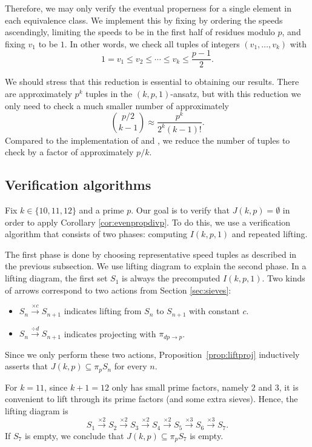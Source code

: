 \documentclass[11pt]{amsart}
\theoremstyle{definition}
\theoremstyle{remark}
\begin{document}
Therefore, we may only verify the eventual properness for a single element in each equivalence class. 
We implement this by fixing by ordering the speeds ascendingly,
limiting the speeds to be in the first half of residues modulo $p$, and fixing $v_1$ to be $1$.
In other words, we check all tuples of integers $(v_1,\ldots,v_k)$ with 
\[1=v_1\leq v_2\leq\cdots\leq v_k\leq\frac{p-1}{2}.\] 

We should stress that this reduction is essential to obtaining our results. 
There are approximately $p^k$ tuples in the $(k,p,1)$-ansatz,
but with this reduction we only need to check a much smaller number of approximately
\[\binom{p/2}{k-1}\approx\frac{p^k}{2^k(k-1)!}.\]
Compared to the implementation of \cite{Rosenfeld} and \cite{Trakulthongchai}, 
we reduce the number of tuples to check by a factor of approximately $p/k$. 

\subsection{Verification algorithms}
\label{subsec:algo}
Fix $k\in\{10,11,12\}$ and a prime $p$. Our goal is to verify that $J(k,p)=\emptyset$
in order to apply Corollary \ref{cor:evenpropdivp}. To do this, we use a verification algorithm that consists of two phases:
computing $I(k, p, 1)$ and repeated lifting.

The first phase is done by choosing representative speed tuples as described in the previous subsection. 
We use lifting diagram to explain the second phase. In a lifting diagram, the first set $S_1$ is always the precomputed $I(k,p,1)$. 
Two kinds of arrows correspond to two actions from Section \ref{sec:sieves}:
\begin{itemize}
    \item $S_n\xrightarrow{\times c}S_{n+1}$ indicates lifting from $S_n$ to $S_{n+1}$ with constant $c$.
    \item $S_n\xrightarrow{\div d}S_{n+1}$ indicates projecting with $\pi_{dp\rightarrow p}$.
\end{itemize}
Since we only perform these two actions, Proposition~\ref{prop:liftproj} inductively asserts that 
$J(k,p) \subseteq \pi_p S_n$ for every $n$. 

For $k=11$, since $k+1=12$ only has small prime factors, namely $2$ and $3$,
it is convenient to lift through its prime factors (and some extra sieves). Hence, the lifting diagram is
\[S_1\xrightarrow{\times 2}S_2\xrightarrow{\times 2}S_3\xrightarrow{\times 2}S_4\xrightarrow{\times 2}S_5\xrightarrow{\times 3}S_6\xrightarrow{\times 3}S_7.\]
If $S_7$ is empty, we conclude that $J(k,p)\subseteq\pi_pS_7$ is empty.
\end{document}
